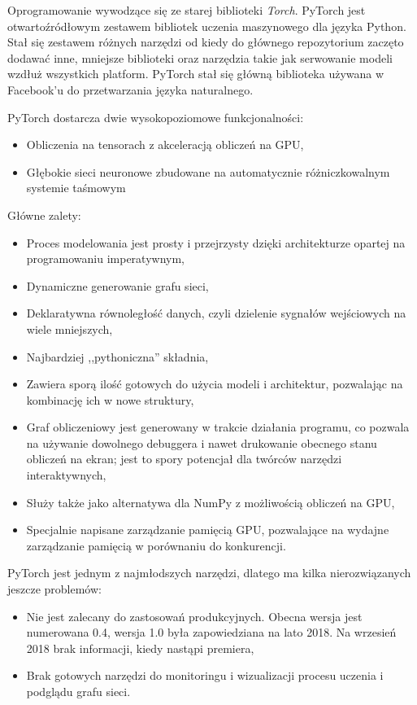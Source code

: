 \documentclass[12pt,a4paper,twoside,titlepage,openright]{book}
\begin{document}
Oprogramowanie wywodzące się ze starej biblioteki \textit{Torch}. PyTorch jest otwartoźródłowym zestawem bibliotek uczenia maszynowego dla języka Python. Stał się zestawem różnych narzędzi od kiedy do głównego repozytorium zaczęto dodawać inne, mniejsze biblioteki oraz narzędzia takie jak serwowanie modeli wzdłuż wszystkich platform. PyTorch stał się główną biblioteka używana w Facebook'u do przetwarzania języka naturalnego. 

PyTorch dostarcza dwie wysokopoziomowe funkcjonalności:
\begin{itemize}
\item Obliczenia na tensorach z akceleracją obliczeń na GPU,
\item Głębokie sieci neuronowe zbudowane na automatycznie różniczkowalnym systemie taśmowym
\end{itemize}

Główne zalety:
\begin{itemize}
\item Proces modelowania jest prosty i przejrzysty dzięki architekturze opartej na programowaniu imperatywnym,
\item Dynamiczne generowanie grafu sieci,
\item Deklaratywna równoległość danych, czyli dzielenie sygnałów wejściowych na wiele mniejszych,
\item Najbardziej ,,pythoniczna'' składnia,
\item Zawiera sporą ilość gotowych do użycia modeli i architektur, pozwalając na kombinację ich w nowe struktury,
\item Graf obliczeniowy jest generowany w trakcie działania programu, co pozwala na używanie dowolnego debuggera i nawet drukowanie obecnego stanu obliczeń na ekran; jest to spory potencjał dla twórców narzędzi interaktywnych,
\item Służy także jako alternatywa dla NumPy z możliwością obliczeń na GPU,
\item Specjalnie napisane zarządzanie pamięcią GPU, pozwalające na wydajne zarządzanie pamięcią w porównaniu do konkurencji.
\end{itemize}

PyTorch jest jednym z najmłodszych narzędzi, dlatego ma kilka nierozwiązanych jeszcze problemów:
\begin{itemize}
\item Nie jest zalecany do zastosowań produkcyjnych. Obecna wersja jest numerowana 0.4, wersja 1.0 była zapowiedziana na lato 2018. Na wrzesień 2018 brak informacji, kiedy nastąpi premiera,
\item Brak gotowych narzędzi do monitoringu i wizualizacji procesu uczenia i podglądu grafu sieci.
\end{itemize}
\end{document}
